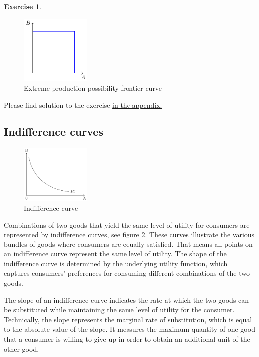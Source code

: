 \documentclass[
  12pt,
  oneside]{book}
\theoremstyle{definition}
\theoremstyle{definition}
\theoremstyle{definition}
\newtheorem{exercise}{Exercise}[chapter]
\theoremstyle{definition}
\theoremstyle{remark}
\begin{document}
\begin{exercise}
\begin{figure}
\centering
\includegraphics[width=0.3\textwidth,height=\textheight]{fig/ppf3.png}
\caption{\label{fig:ppf3} Extreme production possibility frontier curve}
\end{figure}

Please find solution to the exercise \protect\hyperlink{sol:Uproduction}{in the appendix.}
\end{exercise}

\hypertarget{indifference-curves}{%
\subsection{Indifference curves}\label{indifference-curves}}

\begin{figure}
\centering
\includegraphics[width=0.3\textwidth,height=\textheight]{fig/ic1.png}
\caption{\label{fig:ic1} Indifference curve}
\end{figure}

Combinations of two goods that yield the same level of utility for consumers are represented by indifference curves, see figure \ref{fig:ic1}. These curves illustrate the various bundles of goods where consumers are equally satisfied. That means all points on an indifference curve represent the same level of utility. The shape of the indifference curve is determined by the underlying utility function, which captures consumers' preferences for consuming different combinations of the two goods.

The slope of an indifference curve indicates the rate at which the two goods can be substituted while maintaining the same level of utility for the consumer. Technically, the slope represents the marginal rate of substitution, which is equal to the absolute value of the slope. It measures the maximum quantity of one good that a consumer is willing to give up in order to obtain an additional unit of the other good.
\end{document}

